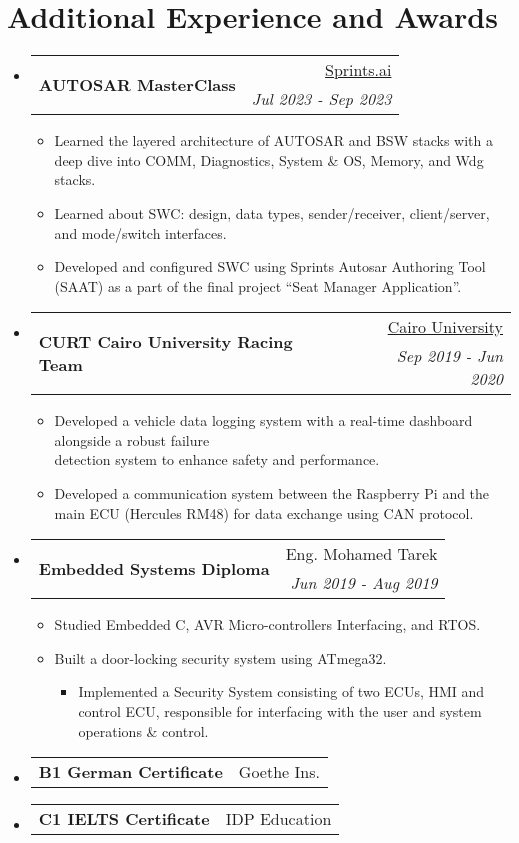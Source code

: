 \documentclass[letterpaper,11pt]{article}
\makeatletter
\newcommand{\CvSubheadingWithoutTitle}[3]{
  \vspace{-1pt}\item
    \begin{tabular*}{0.97\textwidth}{l@{\extracolsep{\fill}}r}
    \multirow{2}{*}{\textbf{#1}} & #2 \\
     & \textit{\small #3} \\
    \end{tabular*}\vspace{-5pt}
}
\newcommand{\CvSubSubheadingWithoutTitleAndDate}[2]{
  \vspace{-1pt}\item
    \begin{tabular*}{0.97\textwidth}{l@{\extracolsep{\fill}}r}
    {\textbf{#1}} & #2 \\
    \end{tabular*}\vspace{-10pt}
}
\newcommand{\CvSubHeadingListStart}{\begin{itemize}[leftmargin=*,topsep = 0pt]}
\newcommand{\CvSubHeadingListEnd}{\end{itemize}}
\makeatother
\begin{document}
\section{Additional Experience and Awards}
    \CvSubHeadingListStart
        \CvSubheadingWithoutTitle
        {AUTOSAR MasterClass}{\href{https://sprints.ai/}{Sprints.ai}}
        {Jul 2023 - Sep 2023}
        {\begin{itemize}[topsep = 2pt, itemsep = -2pt]
          \item Learned the layered architecture of AUTOSAR and BSW stacks with a deep dive into COMM, Diagnostics, System \& OS, Memory, and Wdg stacks.
          \item Learned about SWC: design, data types, sender/receiver, client/server, and mode/switch interfaces.
          \item Developed and configured SWC using Sprints Autosar Authoring Tool (SAAT) as a part of the final project “Seat Manager Application”.
      \end{itemize}}
        \CvSubheadingWithoutTitle
        {CURT Cairo University Racing Team}{\href{https://www.facebook.com/curt.fs}{Cairo University}}
        {Sep 2019 - Jun 2020 }
            {\begin{itemize}[topsep = 2pt, itemsep = -2pt]
                \item Developed a vehicle data logging system with a real-time dashboard alongside a robust failure \\detection system to enhance safety and performance.
                \item Developed a communication system between the Raspberry Pi and the main ECU (Hercules RM48) for data exchange using CAN protocol.
            \end{itemize}}
    \CvSubheadingWithoutTitle
        {Embedded Systems Diploma}{Eng. Mohamed Tarek}
        {Jun 2019 - Aug 2019 }
            \begin{itemize}[topsep = 2pt, itemsep = -2pt]
                \item Studied Embedded C, AVR Micro-controllers Interfacing, and RTOS.
                \item Built a door-locking security system using ATmega32.
                \begin{itemize}[topsep = -1pt]
                    \item Implemented a Security System consisting of two ECUs, HMI and control ECU, responsible for interfacing with the user and system operations \& control.
                \end{itemize} 
            \end{itemize}
    \CvSubSubheadingWithoutTitleAndDate
    {B1 German Certificate} {Goethe Ins.}
    \CvSubSubheadingWithoutTitleAndDate
    {C1 IELTS Certificate} { IDP Education}
    \CvSubHeadingListEnd
%
\end{document}
